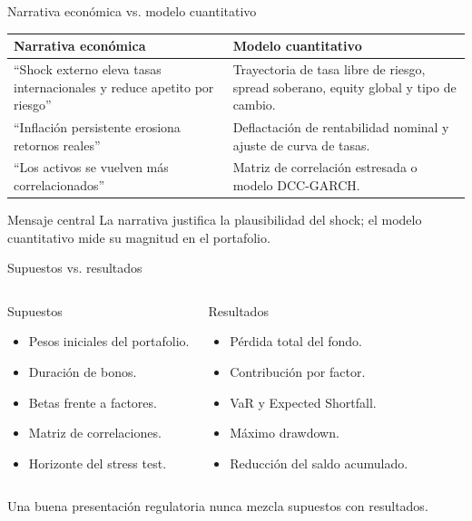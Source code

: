 \documentclass[aspectratio=169,11pt]{beamer}
\begin{document}
\begin{frame}{Narrativa económica vs. modelo cuantitativo}
\begin{table}
\centering
\small
\begin{tabular}{p{} p{}}
\toprule
\textbf{Narrativa económica} & \textbf{Modelo cuantitativo} \\
\midrule
``Shock externo eleva tasas internacionales y reduce apetito por riesgo'' &
Trayectoria de tasa libre de riesgo, spread soberano, equity global y tipo de cambio. \\
\addlinespace
``Inflación persistente erosiona retornos reales'' &
Deflactación de rentabilidad nominal y ajuste de curva de tasas. \\
\addlinespace
``Los activos se vuelven más correlacionados'' &
Matriz de correlación estresada o modelo DCC-GARCH. \\
\bottomrule
\end{tabular}
\end{table}

\begin{block}{Mensaje central}
La narrativa justifica la plausibilidad del shock; el modelo cuantitativo mide su magnitud en el portafolio.
\end{block}
\end{frame}

\begin{frame}{Supuestos vs. resultados}
\begin{columns}[T]
\begin{block}{Supuestos}
\begin{itemize}
  \item Pesos iniciales del portafolio.
  \item Duración de bonos.
  \item Betas frente a factores.
  \item Matriz de correlaciones.
  \item Horizonte del stress test.
\end{itemize}
\end{block}

\begin{block}{Resultados}
\begin{itemize}
  \item Pérdida total del fondo.
  \item Contribución por factor.
  \item VaR y Expected Shortfall.
  \item Máximo drawdown.
  \item Reducción del saldo acumulado.
\end{itemize}
\end{block}
\end{columns}

\vspace{0.3cm}
\centering
\alert{Una buena presentación regulatoria nunca mezcla supuestos con resultados.}
\end{frame}
\end{document}
